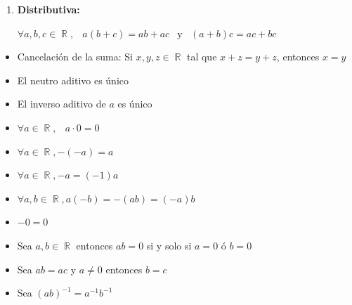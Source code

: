 \documentclass[12pt, fleqn]{report}                             %
\DeclareMathOperator \Space     {\quad}                         %
\DeclareMathOperator \MiniSpace {\;}                            %
\newcommand \Also           {\MiniSpace \text{y} \MiniSpace}    %
\theoremstyle{break}                                            %
\DeclareMathOperator \Reals        {\mathbb{R}}                 %
\begin{document}
\begin{multicols}{2}
\begin{enumerate}
                \item 
                    \textbf{Distributiva:}

                    $\forall a, b, c \in \Reals, \MiniSpace
                            a(b + c) = ab + ac \Also (a + b)c = ac + bc$

            \end{enumerate}

            \begin{itemize}

                \item Cancelación de la suma: 
                    Si $x, y, z \in \Reals$ tal que $x + z = y + z$, entonces $x = y$

                \item El neutro aditivo es único

                \item El inverso aditivo de $a$ es único

                \item $\forall a \in \Reals, \MiniSpace a \cdot 0 = 0$

                \item $\forall a \in \Reals,  -(-a) = a$

                \item $\forall a \in \Reals,  -a = (-1)a$

                \item $\forall a, b \in \Reals, a(-b) = -(ab) = (-a)b$

                \item $-0 = 0$

                \item Sea $a, b \in \Reals$ entonces $ab = 0$ si y solo si $a=0$ ó $b=0$

                \item Sea $ab = ac$ y $a \neq 0$ entonces $b = c$

                \item Sea $(ab)^{-1} = a^{-1}b^{-1}$

            \end{itemize}

        \end{multicols}

        
        \clearpage
\end{document}
